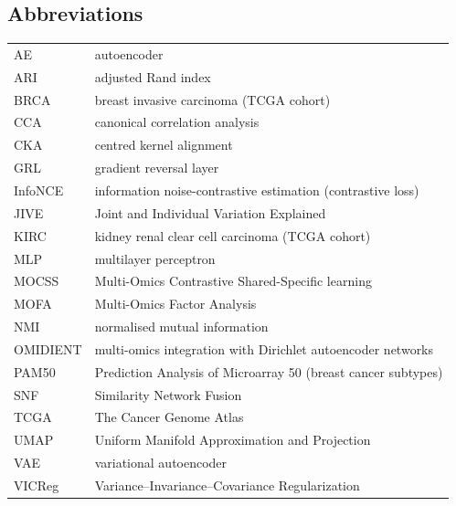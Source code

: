 \subsection*{Abbreviations}

\begin{tabular}{ll}
AE & autoencoder \\
ARI & adjusted Rand index \\
BRCA & breast invasive carcinoma (TCGA cohort) \\
CCA & canonical correlation analysis \\
CKA & centred kernel alignment \\
GRL & gradient reversal layer \\
InfoNCE & information noise-contrastive estimation (contrastive loss) \\
JIVE & Joint and Individual Variation Explained \\
KIRC & kidney renal clear cell carcinoma (TCGA cohort) \\
MLP & multilayer perceptron \\
MOCSS & Multi-Omics Contrastive Shared-Specific learning \\
MOFA & Multi-Omics Factor Analysis \\
NMI & normalised mutual information \\
OMIDIENT & multi-omics integration with Dirichlet autoencoder networks \\
PAM50 & Prediction Analysis of Microarray 50 (breast cancer subtypes) \\
SNF & Similarity Network Fusion \\
TCGA & The Cancer Genome Atlas \\
UMAP & Uniform Manifold Approximation and Projection \\
VAE & variational autoencoder \\
VICReg & Variance--Invariance--Covariance Regularization \\
\end{tabular}

